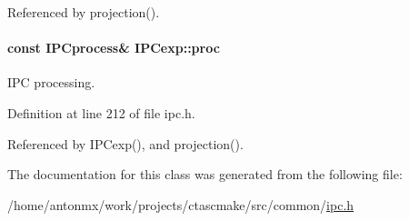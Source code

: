 Referenced by projection().

\hypertarget{classIPCexp_af58ae99f8445d3dfc9e116314a2dc1c6}{
\paragraph[{proc}]{\setlength{\rightskip}{0pt plus 5cm}const {\bf IPCprocess}\& {\bf IPCexp::proc}}\hfill}
\label{classIPCexp_af58ae99f8445d3dfc9e116314a2dc1c6}


IPC processing. 



Definition at line 212 of file ipc.h.



Referenced by IPCexp(), and projection().



The documentation for this class was generated from the following file:\begin{DoxyCompactItemize}
\item 
/home/antonmx/work/projects/ctascmake/src/common/\hyperlink{ipc_8h}{ipc.h}\end{DoxyCompactItemize}
